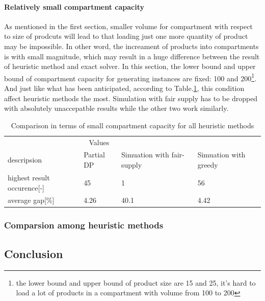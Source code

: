 \documentclass{article}
\begin{document}
\paragraph{Relatively small compartment capacity}
As mentioned in the first section, smaller volume for compartment with respect to size of prodcuts will lead to that loading just one more quantity of product may be impossible. In other word, the increament of products into compartments is with small magnitude, which may result in a huge difference between the result of heuristic method and exact solver. In this section, the lower bound and upper bound of compartment capacity for generating instances are fixed: 100 and 200\footnote{the lower bound and upper bound of product size are 15 and 25, it's hard to load a lot of products in a compartment with volume from 100 to 200}. And just like what has been anticipated, according to Table.\ref{tab:small compartment capacity for heu}, this condition affect heuristic methods the most. Simulation with fair supply has to be dropped with absolutely unaccepatble results while the other two work similarly.

\begin{table}[ht]
 \caption{Comparison in terms of small compartment capacity for all heuristic methods}
  \centering
  \begin{tabular}{llll}
    \toprule
    \multicolumn{3}{c}{Values}                   \\
    \cmidrule(r){2-3}
    descripsion   & Partial DP    & Simuation with fair-supply      & Simuation with greedy \\
    \midrule
    highest result occurence[-]	&	45 	&	1	&	56	\\
    average gap[\%]	&	4.26	&	40.1 	&	4.42 	\\
    \bottomrule
  \end{tabular}
  \label{tab:small compartment capacity for heu}
\end{table}

\subsubsection{Comparsion among heuristic methods}

\subsection{Conclusion }


  
\end{document}
